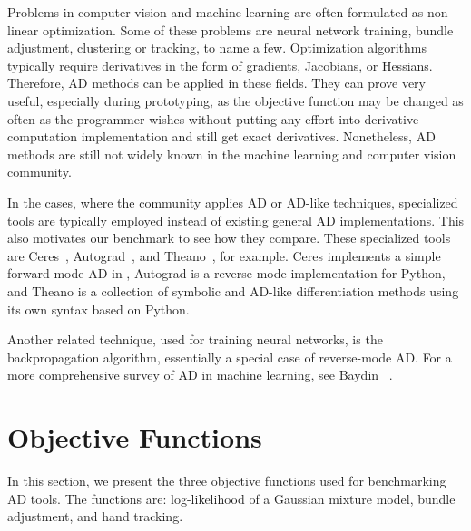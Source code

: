 \documentclass[suppldata]{article}
\begin{document}
Problems in computer vision and machine learning are often formulated as non-linear optimization. Some of these problems are neural network training, bundle adjustment, clustering or tracking, to name a few. Optimization algorithms typically require derivatives in the form of gradients, Jacobians, or Hessians. Therefore, AD methods can be applied in these fields. They can prove very useful, especially during prototyping, as the objective function may be changed as often as the programmer wishes without putting any effort into derivative-computation implementation and still get exact derivatives. Nonetheless, AD methods are still not widely known in the machine learning and computer vision community.

In the cases, where the community applies AD or AD-like techniques, specialized tools are typically employed instead of existing general AD implementations. 
This also motivates our benchmark to see how they compare. 
These specialized tools are Ceres~\cite{ceres}, Autograd~\cite{autograd}, and Theano~\cite{Bastien12theano}, for example. Ceres implements a simple forward mode AD in \Cpp{}, 
Autograd is a reverse mode implementation for Python, and 
Theano is a collection of symbolic and AD-like differentiation methods using its own syntax based on Python. 

Another related technique, used for training neural networks, is the backpropagation algorithm, essentially a special case of reverse-mode AD.
For a more comprehensive survey of AD in machine learning, see Baydin \etal~\cite{Baydin15survey}.

\section{Objective Functions}
\label{sec:ofun}
In this section, we present the three objective functions used for benchmarking AD tools. The functions are: log-likelihood of a Gaussian mixture model, bundle adjustment, and hand tracking. 
\end{document}
